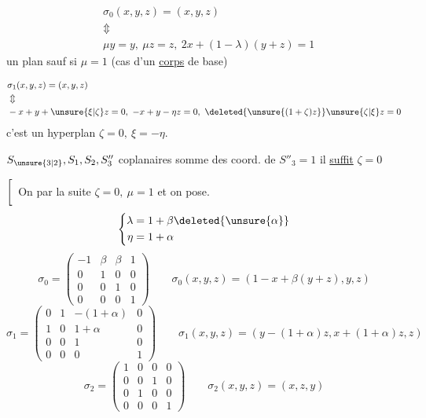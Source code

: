 \[
\begin{aligned}
&\sigma_0(x,y,z)=(x,y,z)\\
&\Updownarrow\\
&\mu y=y,\ \mu z=z,\ 2x+(1-\lambda)(y+z)=1
\end{aligned}
\]
  un plan sauf si $\mu=1$ (cas d'un \uline{corps} de base)

\[
\begin{aligned}
&\sigma_1(x,y,z)=(x,y,z)\\
&\Updownarrow\\
&-x+y+\unsure{\xi|\zeta}z=0,\ -x+y-\eta z=0,\ \deleted{\unsure{(1+\zeta)z}}\unsure{\zeta|\xi}z=0
\end{aligned}
\]
 c'est un hyperplan  $\zeta=0,\ \xi=-\eta$.

$S_{\unsure{3|2}},S_1,S_2,S''_3$ coplanaires  somme des coord. de $S''_3=1$
il \uline{suffit} $\zeta=0$

$\left[\vphantom{\begin{matrix}1\\1\end{matrix}}\right.$ On  par la suite $\boxed{\zeta=0,\ \mu=1}$ et on pose.
\[
\left\{\begin{aligned}
\lambda&=1+\beta\deleted{\unsure{\alpha}}\\
\eta&=1+\alpha
\end{aligned}\right.
\]
\[
\sigma_0=\begin{pmatrix}
-1&\beta&\beta&1\\
0&1&0&0\\
0&0&1&0\\
0&0&0&1
\end{pmatrix}
\qquad
\sigma_0(x,y,z)=(1-x+\beta(y+z),y,z)
\]
\[
\sigma_1=\begin{pmatrix}
0&1&-(1+\alpha)&0\\
1&0&1+\alpha&0\\
0&0&1&0\\
0&0&0&1
\end{pmatrix}
\qquad
\sigma_1(x,y,z)=(y-(1+\alpha)z,x+(1+\alpha)z,z)
\]
\[
\sigma_2=\begin{pmatrix}
1&0&0&0\\
0&0&1&0\\
0&1&0&0\\
0&0&0&1
\end{pmatrix}
\qquad
\sigma_2(x,y,z)=(x,z,y)
\]

